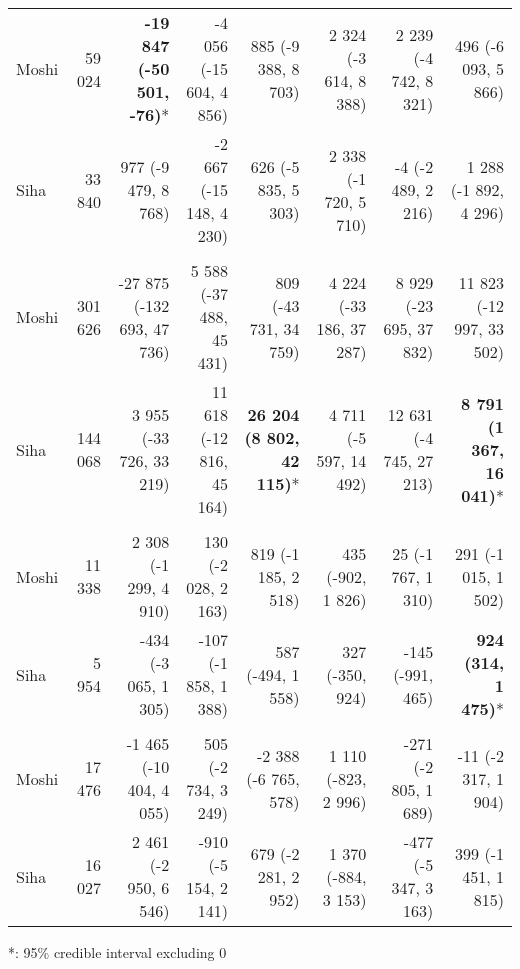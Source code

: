 \begin{table}[t]
\begin{tabular*}{\linewidth}{@{\extracolsep{\fill}}l|rrrrrrr}
\midrule\addlinespace[2.5pt]
\multicolumn{8}{l}{Diarrhea} \\[2.5pt] 
\midrule\addlinespace[2.5pt]
Moshi & 59 024 & \textbf{-19 847 (-50 501, -76)}* & -4 056 (-15 604, 4 856) & 885 (-9 388, 8 703) & 2 324 (-3 614, 8 388) & 2 239 (-4 742, 8 321) & 496 (-6 093, 5 866) \\ 
Siha & 33 840 & 977 (-9 479, 8 768) & -2 667 (-15 148, 4 230) & 626 (-5 835, 5 303) & 2 338 (-1 720, 5 710) & -4 (-2 489, 2 216) & 1 288 (-1 892, 4 296) \\ 
\midrule\addlinespace[2.5pt]
\multicolumn{8}{l}{Urinary Tract Infections} \\[2.5pt] 
\midrule\addlinespace[2.5pt]
Moshi & 301 626 & -27 875 (-132 693, 47 736) & 5 588 (-37 488, 45 431) & 809 (-43 731, 34 759) & 4 224 (-33 186, 37 287) & 8 929 (-23 695, 37 832) & 11 823 (-12 997, 33 502) \\ 
Siha & 144 068 & 3 955 (-33 726, 33 219) & 11 618 (-12 816, 45 164) & \textbf{26 204 (8 802, 42 115)}* & 4 711 (-5 597, 14 492) & 12 631 (-4 745, 27 213) & \textbf{8 791 (1 367, 16 041)}* \\ 
\midrule\addlinespace[2.5pt]
\multicolumn{8}{l}{Malaria} \\[2.5pt] 
\midrule\addlinespace[2.5pt]
Moshi & 11 338 & 2 308 (-1 299, 4 910) & 130 (-2 028, 2 163) & 819 (-1 185, 2 518) & 435 (-902, 1 826) & 25 (-1 767, 1 310) & 291 (-1 015, 1 502) \\ 
Siha & 5 954 & -434 (-3 065, 1 305) & -107 (-1 858, 1 388) & 587 (-494, 1 558) & 327 (-350, 924) & -145 (-991, 465) & \textbf{924 (314, 1 475)}* \\ 
\midrule\addlinespace[2.5pt]
\multicolumn{8}{l}{Infectious Eye Disease} \\[2.5pt] 
\midrule\addlinespace[2.5pt]
Moshi & 17 476 & -1 465 (-10 404, 4 055) & 505 (-2 734, 3 249) & -2 388 (-6 765, 578) & 1 110 (-823, 2 996) & -271 (-2 805, 1 689) & -11 (-2 317, 1 904) \\ 
Siha & 16 027 & 2 461 (-2 950, 6 546) & -910 (-5 154, 2 141) & 679 (-2 281, 2 952) & 1 370 (-884, 3 153) & -477 (-5 347, 3 163) & 399 (-1 451, 1 815) \\ 
\bottomrule
\end{tabular*}
\begin{minipage}{\linewidth}
*: 95\% credible interval excluding 0\\
\end{minipage}
\end{table}

